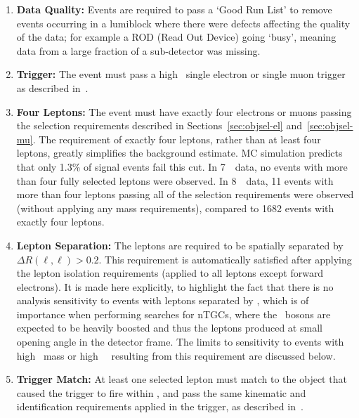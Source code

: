 \begin{enumerate}

    \item {\bf Data Quality:} Events are required to pass a `Good Run List' to
    remove events occurring in a lumiblock where there were defects affecting
    the quality of the data; for example a ROD (Read Out Device) going `busy',
    meaning data from a large fraction of a sub-detector was missing.

    \item {\bf Trigger:} The event must pass a high \pt\ single electron or single
    muon trigger as described in~.

    \item {\bf Four Leptons:} The event must have exactly four electrons or
    muons passing the selection requirements described in
    Sections~\ref{sec:objsel-el} and~\ref{sec:objsel-mu}. The requirement of
    exactly four leptons, rather than at least four leptons, greatly simplifies
    the background estimate. MC simulation predicts that only
    1.3\% of signal events fail this cut. 
    In 7~\tev\ data, no events with more
    than four fully selected leptons were observed.
    In 8~\tev\ data, 11 events with more than four leptons passing all of the
    selection requirements were observed (without applying any mass
    requirements), compared to 1682 events with exactly four leptons.

    \item {\bf Lepton Separation:} The leptons are required to be spatially
    separated by $\Delta{R}(\ell,\ell)>0.2$. This requirement is automatically
    satisfied after applying the lepton isolation requirements (applied to all
    leptons except forward electrons). It is made here explicitly, 
    to highlight the fact that there is no analysis sensitivity to events with
    leptons separated by , which is of importance when performing
    searches for nTGCs, where the \Z\ bosons are expected to be heavily boosted
    and thus the leptons produced at small opening angle in the detector frame.
    The limits to sensitivity to events with high \ZZ\ mass or high \Z\ \pt\
    resulting from this requirement are discussed below.

    \item {\bf Trigger Match:} At least one selected lepton must match to the
    object that caused the trigger to fire within \deltaRlt{0.1}, and pass the
    same kinematic and identification requirements applied in the trigger,
    as described in~\sec{triggers}. 


\end{enumerate}
